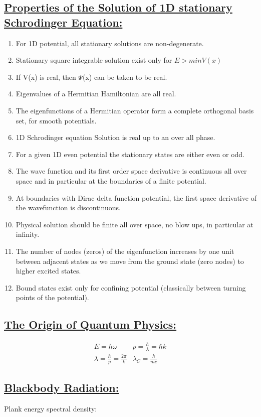 \documentclass[a4paper,12pt]{article}
\begin{document}
\subsection*{\underline{Properties of the Solution of 1D stationary Schrodinger Equation:}}
\begin{enumerate}
\item For 1D potential, all stationary solutions are non-degenerate.
\item Stationary square integrable solution exist only for $E > min{V(x)}$ 
\item If V(x) is real, then $\Psi$(x) can be taken to be real.
\item Eigenvalues of a Hermitian Hamiltonian are all real.
\item The eigenfunctions of a Hermitian operator form a complete orthogonal basis set, for smooth potentials.
\item 1D Schrodinger equation Solution is real up to an over all phase.
\item For a given 1D even potential the stationary states are either even or odd.
\item The wave function and its first order space derivative is continuous all over space and in particular at the boundaries of a finite potential.
\item At boundaries with Dirac delta function potential, the first space derivative of the wavefunction is discontinuous. 
\item Physical solution should be finite all over space, no blow ups, in particular at infinity.
\item The number of nodes (zeros) of the eigenfunction increases by one unit between adjacent states as we move from the ground state (zero nodes) to higher excited states.
\item Bound states exist only for confining potential (classically between turning points of the potential).
\end{enumerate}
\subsection*{\underline{The Origin of Quantum Physics:}}
\begin{align}
    &E=h\omega
    &p=\frac{h}{\lambda}=\hbar k
    &\\
    &\lambda=\frac{h}{p} = \frac{2\pi}{k}
    &\lambda_C = \frac{h}{mc}
\end{align}
\subsection*{\underline{Blackbody Radiation:}}
Plank energy spectral density: 
\vspace{0.3cm}
\end{document}
